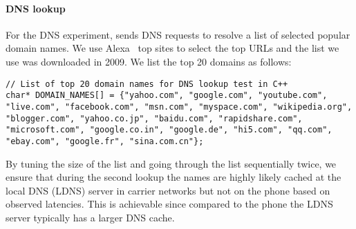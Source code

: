 \paragraph{DNS lookup}
For the DNS experiment, \mobiperf sends DNS requests to resolve a list of selected popular domain names. We use Alexa~\cite{alexa} top sites to select the top URLs and the list we use was downloaded in 2009. We list the top 20 domains as follows:
\lstset{language=C++}
\begin{lstlisting}
// List of top 20 domain names for DNS lookup test in C++
char* DOMAIN_NAMES[] = {"yahoo.com", "google.com", "youtube.com", "live.com", "facebook.com", "msn.com", "myspace.com", "wikipedia.org", "blogger.com", "yahoo.co.jp", "baidu.com", "rapidshare.com", "microsoft.com", "google.co.in", "google.de", "hi5.com", "qq.com", "ebay.com", "google.fr", "sina.com.cn"};
\end{lstlisting}


By tuning the size of the list and going through the list sequentially twice, we ensure that during the second lookup the names are highly likely cached at the local DNS (LDNS) server in carrier networks but not on the phone based on observed latencies. This is achievable since compared to the phone the LDNS server typically has a larger DNS cache. 


